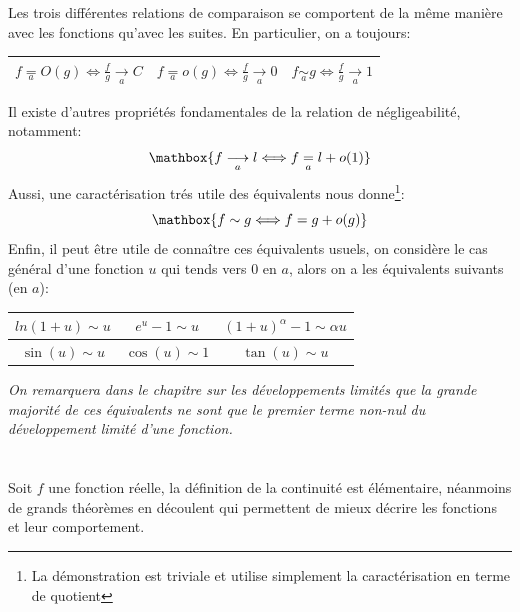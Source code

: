 \subsection*{}
Les trois différentes relations de comparaison se comportent de la même manière avec les fonctions qu'avec les suites. En particulier, on a toujours:
\begin{center}
   \renewcommand{\arraystretch}{1.5}%
   \begin{tabular}{| c | c | c |}
   \hline
   \(f \underset{a}{=} O(g) \Longleftrightarrow \frac{f}{g} \underset{a}{\longrightarrow} C\) &    \(f \underset{a}{=} o(g) \Longleftrightarrow \frac{f}{g} \underset{a}{\longrightarrow} 0\) &    \(f \underset{a}{\sim} g \Longleftrightarrow \frac{f}{g} \underset{a}{\longrightarrow} 1\)\\ [1.5ex]
   \hline
   \end{tabular}
\end{center}  
Il existe d'autres propriétés fondamentales de la relation de négligeabilité, notamment:
\[
   \mathbox{f \underset{a}{\longrightarrow} l \Longleftrightarrow f \underset{a}{=} l + o(1)}
\] 
Aussi, une caractérisation trés utile des équivalents nous donne\footnote[2]{La démonstration est triviale et utilise simplement la caractérisation en terme de quotient}:
\[
   \mathbox{f \sim g \Longleftrightarrow f = g + o(g)}
\] 
Enfin, il peut être utile de connaître ces équivalents usuels, on considère le cas général d'une fonction \(u\) qui tends vers 0 en \(a\), alors on a les équivalents suivants (en \(a\)):

\begin{center}
   \renewcommand{\arraystretch}{1.5}%
   \begin{tabular}{| c | c | c |}
   \hline
   \(ln(1 + u) \sim u\) & \(e^u - 1 \sim u\) & \((1 + u)^\alpha - 1 \sim \alpha u\)\\ [0.5ex]
   \hline
   \(\sin(u) \sim u\) & \(\cos(u) \sim 1\) & \(\tan(u) \sim u\)\\ [0.5ex]
   \hline
   \end{tabular}
\end{center} 
\begin{center}
   \textit{
      On remarquera dans le chapitre sur les développements limités que la grande majorité de ces équivalents ne sont que le premier terme non-nul du développement limité d'une fonction.
   }
\end{center}

\chapter*{}
Soit \(f\) une fonction réelle, la définition de la continuité est élémentaire, néanmoins de grands théorèmes en découlent qui permettent de mieux décrire les fonctions et leur comportement.\<

